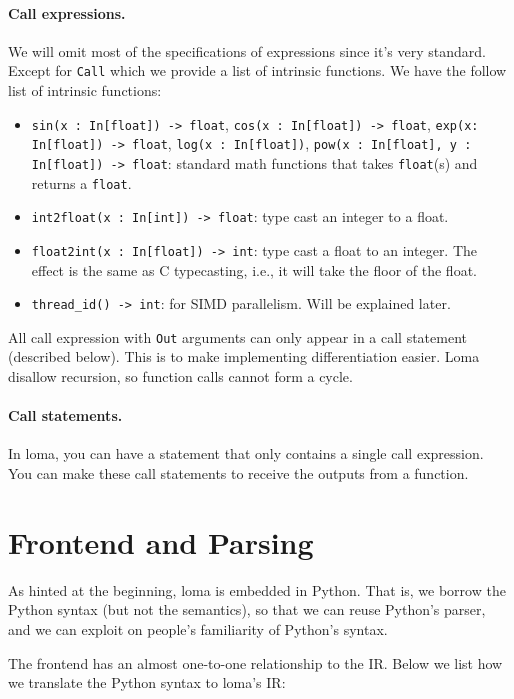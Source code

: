 \paragraph{Call expressions.}
We will omit most of the specifications of expressions since it's very standard. Except for \lstinline{Call} which we provide a list of intrinsic functions. We have the follow list of intrinsic functions:

\begin{itemize}
\item \lstinline{sin(x : In[float]) -> float}, \lstinline{cos(x : In[float]) -> float}, \lstinline{exp(x: In[float]) -> float}, \lstinline{log(x : In[float])}, \lstinline{pow(x : In[float], y : In[float]) -> float}: standard math functions that takes \lstinline{float}(s) and returns a \lstinline{float}.
\item \lstinline{int2float(x : In[int]) -> float}: type cast an integer to a float.
\item \lstinline{float2int(x : In[float]) -> int}: type cast a float to an integer. The effect is the same as C typecasting, i.e., it will take the floor of the float.
\item \lstinline{thread_id() -> int}: for SIMD parallelism. Will be explained later.
\end{itemize}

All call expression with \lstinline{Out} arguments can only appear in a call statement (described below). This is to make implementing differentiation easier. Loma disallow recursion, so function calls cannot form a cycle.

\paragraph{Call statements.}
In loma, you can have a statement that only contains a single call expression. You can make these call statements to receive the outputs from a function.

\section{Frontend and Parsing}
As hinted at the beginning, loma is embedded in Python. That is, we borrow the Python syntax (but not the semantics), so that we can reuse Python's parser, and we can exploit on people's familiarity of Python's syntax. 

The frontend has an almost one-to-one relationship to the IR. Below we list how we translate the Python syntax to loma's IR: 


